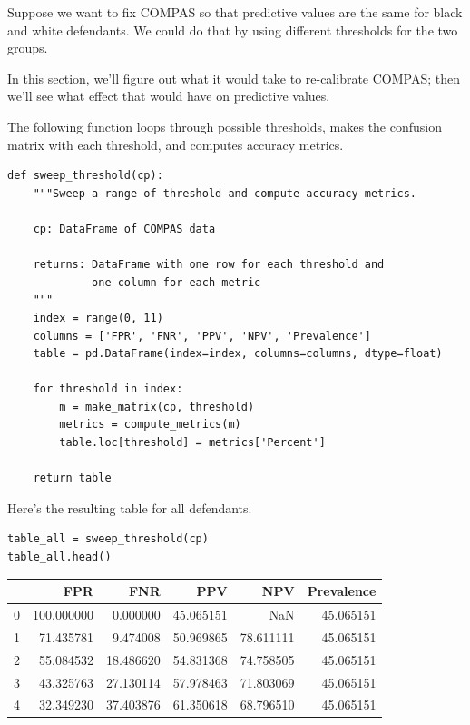 Suppose we want to fix COMPAS so that predictive values are the same for
black and white defendants. We could do that by using different
thresholds for the two groups.

In this section, we'll figure out what it would take to re-calibrate
COMPAS; then we'll see what effect that would have on predictive values.

The following function loops through possible thresholds, makes the
confusion matrix with each threshold, and computes accuracy metrics.

\begin{lstlisting}[]
def sweep_threshold(cp):
    """Sweep a range of threshold and compute accuracy metrics.
    
    cp: DataFrame of COMPAS data
    
    returns: DataFrame with one row for each threshold and
             one column for each metric
    """
    index = range(0, 11)
    columns = ['FPR', 'FNR', 'PPV', 'NPV', 'Prevalence']
    table = pd.DataFrame(index=index, columns=columns, dtype=float) 

    for threshold in index:
        m = make_matrix(cp, threshold)
        metrics = compute_metrics(m)
        table.loc[threshold] = metrics['Percent']
        
    return table
\end{lstlisting}

Here's the resulting table for all defendants.

\begin{lstlisting}[]
table_all = sweep_threshold(cp)
table_all.head()
\end{lstlisting}

\begin{tabular}{lrrrrr}
\midrule
{} &         FPR &        FNR &        PPV &        NPV &  Prevalence \\
\midrule
0 &  100.000000 &   0.000000 &  45.065151 &        NaN &   45.065151 \\
1 &   71.435781 &   9.474008 &  50.969865 &  78.611111 &   45.065151 \\
2 &   55.084532 &  18.486620 &  54.831368 &  74.758505 &   45.065151 \\
3 &   43.325763 &  27.130114 &  57.978463 &  71.803069 &   45.065151 \\
4 &   32.349230 &  37.403876 &  61.350618 &  68.796510 &   45.065151 \\
\midrule
\end{tabular}

